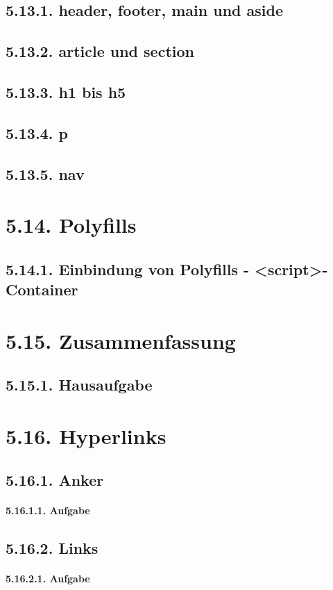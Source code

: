 \subsection{5.13.1.	header, footer, main und aside}
\subsection{5.13.2.	article und section}
\subsection{5.13.3.	h1 bis h5}
\subsection{5.13.4.	p}
\subsection{5.13.5.	nav}
\section{5.14.	Polyfills}
\subsection{5.14.1.	Einbindung von Polyfills - <script>-Container}
\section{5.15.	Zusammenfassung}
\subsection{5.15.1.	Hausaufgabe}
\section{5.16.	Hyperlinks}
\subsection{5.16.1.	Anker}
\paragraph{5.16.1.1.	Aufgabe}
\subsection{5.16.2.	Links}
\paragraph{5.16.2.1.	Aufgabe}
